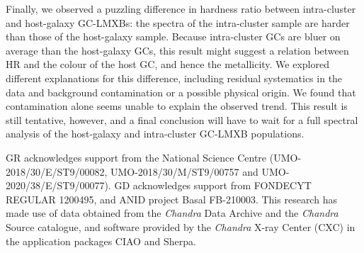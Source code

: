\documentclass{aa}
\begin{document}
Finally, we observed a puzzling  difference in hardness ratio between intra-cluster and host-galaxy GC-LMXBs: the spectra of the intra-cluster sample are harder  than those of the host-galaxy sample. 
Because intra-cluster GCs are bluer on average than the host-galaxy GCs, this result might suggest a relation between HR and the colour of the host GC, and hence the metallicity. We explored different explanations for this difference, including residual systematics in the data and background contamination or a possible physical origin. We found that contamination alone seems unable to explain the observed trend. This result is still tentative, however, and a final conclusion will have to wait for a full spectral analysis of the host-galaxy and intra-cluster GC-LMXB populations.

\begin{acknowledgements}
 GR acknowledges support from the National Science Centre (UMO-2018/30/E/ST9/00082, UMO-2018/30/M/ST9/00757 and UMO-2020/38/E/ST9/00077). 
 GD acknowledges support from FONDECYT REGULAR 1200495, and ANID project Basal FB-210003. This research has made use of data obtained from the \textit{Chandra} Data Archive and the \textit{Chandra} Source catalogue, and software provided by the \textit{Chandra} X-ray Center (CXC) in the application packages CIAO and Sherpa.
 \end{acknowledgements}

%
%

\end{document}
